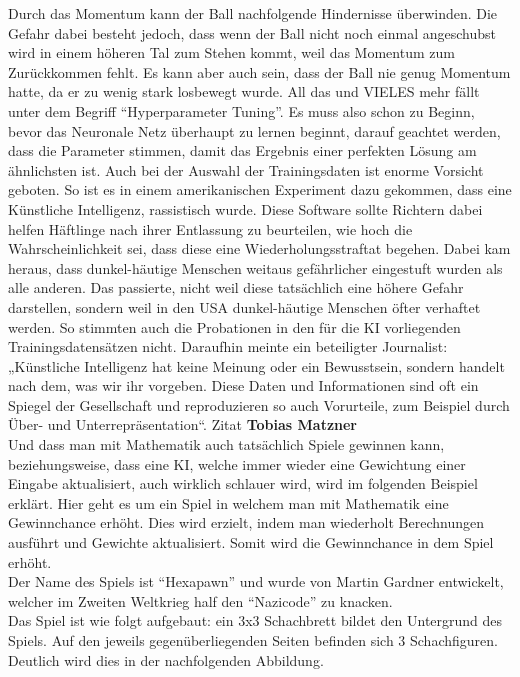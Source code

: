 Durch das Momentum kann der Ball nachfolgende Hindernisse überwinden. Die Gefahr dabei besteht jedoch, dass wenn der Ball nicht noch einmal angeschubst wird in einem höheren Tal zum Stehen kommt, weil das Momentum zum Zurückkommen fehlt. Es kann aber auch sein, dass der Ball nie genug Momentum hatte, da er zu wenig stark losbewegt wurde. All das und VIELES mehr fällt unter dem Begriff ``Hyperparameter Tuning''. Es muss also schon zu Beginn, bevor das Neuronale Netz überhaupt zu lernen beginnt, darauf geachtet werden, dass die Parameter stimmen, damit das Ergebnis einer perfekten Lösung am ähnlichsten ist.
Auch bei der Auswahl der Trainingsdaten ist enorme Vorsicht geboten. So ist es in einem amerikanischen Experiment dazu gekommen, dass eine Künstliche Intelligenz, rassistisch wurde. Diese Software sollte Richtern dabei helfen Häftlinge nach ihrer Entlassung zu beurteilen, wie hoch die Wahrscheinlichkeit sei, dass diese eine Wiederholungsstraftat begehen. Dabei kam heraus, dass dunkel-häutige Menschen weitaus gefährlicher eingestuft wurden als alle anderen. Das passierte, nicht weil diese tatsächlich eine höhere Gefahr darstellen, sondern weil in den USA dunkel-häutige Menschen öfter verhaftet werden. So stimmten auch die Probationen in den für die KI vorliegenden Trainingsdatensätzen nicht. Daraufhin meinte ein beteiligter Journalist: „Künstliche Intelligenz hat keine Meinung oder ein Bewusstsein, sondern handelt nach dem, was wir ihr vorgeben. Diese Daten und Informationen sind oft ein Spiegel der Gesellschaft und reproduzieren so auch Vorurteile, zum Beispiel durch Über- und Unterrepräsentation“.
Zitat \textbf{Tobias Matzner}
\\
Und dass man mit Mathematik auch tatsächlich Spiele gewinnen kann, beziehungsweise, dass eine KI, welche immer wieder eine Gewichtung einer Eingabe aktualisiert, auch wirklich schlauer wird, wird im folgenden Beispiel erklärt. Hier geht es um ein Spiel in welchem man mit Mathematik eine Gewinnchance erhöht. Dies wird erzielt, indem man wiederholt Berechnungen ausführt und Gewichte aktualisiert. Somit wird die Gewinnchance in dem Spiel erhöht.
\\
Der Name des Spiels ist ``Hexapawn'' und wurde von Martin Gardner entwickelt, welcher im Zweiten Weltkrieg half den ``Nazicode'' zu knacken.
\\
Das Spiel ist wie folgt aufgebaut: ein 3x3 Schachbrett bildet den Untergrund des Spiels. Auf den jeweils gegenüberliegenden Seiten befinden sich 3 Schachfiguren. Deutlich wird dies in der nachfolgenden Abbildung.


